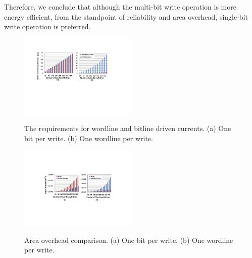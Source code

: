 Therefore, we conclude that although the multi-bit write operation is more
energy efficient, from the standpoint of reliability and area overhead,
single-bit write operation is preferred.
\begin{figure}%
\centering
  \includegraphics[width=0.5\textwidth]{./figures/drive_i_f.pdf}\\
  \caption{The requirements for wordline and bitline driven currents. (a) One bit per write. (b) One wordline per write.}\label{fig:drive_i}
  \vspace{-10pt}
\end{figure}



\begin{figure}%
\centering
  \includegraphics[width=0.5\textwidth]{./figures/area_comp_f1.pdf}\\
  \caption{Area overhead comparison. (a) One bit per write. (b) One wordline per write.}\label{fig:area_i}
\vspace{-10pt}
\end{figure}

%
%

